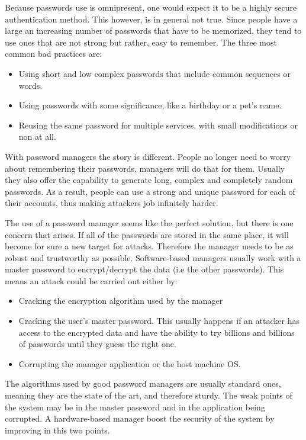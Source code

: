 Because passwords use is omnipresent, one would expect it to be a highly secure authentication method. This however, is in general not true. Since people have a large an increasing number of passwords that have to be memorized, they tend to use ones that are not strong but rather, easy to remember. The three most common bad practices are:
\begin{itemize}
\setlength\itemsep{-3pt}
\item Using short and low complex passwords that include common sequences or words.
\item Using passwords with some significance, like a birthday or a pet's name.
\item Reusing the same password for multiple services, with small modifications or non at all.
\end{itemize}

With password managers the story is different. People no longer need to worry about remembering their passwords, managers will do that for them. Usually they also offer the capability to generate long, complex and completely random passwords. As a result, people can use a strong and unique password for each of their accounts, thus making attackers job infinitely harder.

\vspace{15pt}

The use of a password manager seems like the perfect solution, but there is one concern that arises. If all of the passwords are stored in the same place, it will become for sure a new target for attacks. Therefore the manager needs to be as robust and trustworthy as possible. Software-based managers usually work with a master password to encrypt/decrypt the data (i.e the other passwords). This means an attack could be carried out either by:
\begin{itemize}
\setlength\itemsep{-3pt}
\item Cracking the encryption algorithm used by the manager
\item Cracking the user's master password. This usually happens if an attacker has access to the encrypted data and have the ability to try billions and billions of passwords until they guess the right one.
\item Corrupting the manager application or the host machine OS.
\end{itemize}

The algorithms used by good password managers are usually standard ones, meaning they are the state of the art, and therefore sturdy. The weak points of the system may be in the master password and in the application being corrupted. A hardware-based manager boost the security of the system by improving in this two points. 

